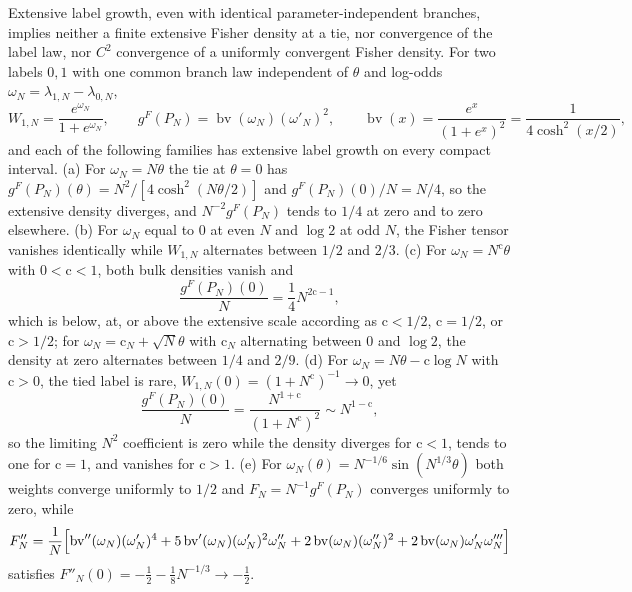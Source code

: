 \label{eq:rg-thermo-label-linear-tie-example}
\label{eq:rg-thermo-label-oscillatory-data}
\label{eq:rg-thermo-label-oscillatory-failure}
Extensive label growth, even with identical parameter-independent branches, implies neither a
finite extensive Fisher density at a tie, nor convergence of the label law, nor $C^2$ convergence
of a uniformly convergent Fisher density. For two labels $0,1$ with one common branch law
independent of $\theta$ and log-odds $\omega_N=\lambda_{1,N}-\lambda_{0,N}$,
\begin{equation}
W_{1,N}=\frac{e^{\omega_N}}{1+e^{\omega_N}},
\qquad
g^F(P_N)=\operatorname{bv}(\omega_N)(\omega'_N)^2,
\qquad
\operatorname{bv}(x)=\frac{e^x}{(1+e^x)^2}=\frac1{4\cosh^2(x/2)},
\label{eq:rg-thermo-label-binary-formula}
\end{equation}
and each of the following families has extensive label growth on every compact interval. (a) For
$\omega_N=N\theta$ the tie at $\theta=0$ has $g^F(P_N)(\theta)=N^2/[4\cosh^2(N\theta/2)]$ and
$g^F(P_N)(0)/N=N/4$, so the extensive density diverges, and $N^{-2}g^F(P_N)$ tends to $1/4$ at zero
and to zero elsewhere. (b) For $\omega_N$ equal to $0$ at even $N$ and $\log2$ at odd $N$, the
Fisher tensor vanishes identically while $W_{1,N}$ alternates between $1/2$ and $2/3$. (c) For
$\omega_N=N^{\mathrm c}\theta$ with $0<\mathrm c<1$, both bulk densities vanish and
\begin{equation}
\frac{g^F(P_N)(0)}N=\frac14N^{2\mathrm c-1},
\label{eq:rg-thermo-label-subextensive-example}
\end{equation}
which is below, at, or above the extensive scale according as $\mathrm c<1/2$, $\mathrm c=1/2$, or
$\mathrm c>1/2$; for $\omega_N=\mathrm c_N+\sqrt N\theta$ with $\mathrm c_N$ alternating between $0$
and $\log2$, the density at zero alternates between $1/4$ and $2/9$. (d) For
$\omega_N=N\theta-\mathrm c\log N$ with $\mathrm c>0$, the tied label is rare,
$W_{1,N}(0)=(1+N^{\mathrm c})^{-1}\to0$, yet
\begin{equation}
\frac{g^F(P_N)(0)}N=\frac{N^{1+\mathrm c}}{(1+N^{\mathrm c})^2}\sim N^{1-\mathrm c},
\label{eq:rg-thermo-label-rare-example}
\end{equation}
so the limiting $N^2$ coefficient is zero while the density diverges for $\mathrm c<1$, tends to one
for $\mathrm c=1$, and vanishes for $\mathrm c>1$. (e) For
$\omega_N(\theta)=N^{-1/6}\sin(N^{1/3}\theta)$ both weights converge uniformly to $1/2$ and
$F_N=N^{-1}g^F(P_N)$ converges uniformly to zero, while
\begin{equation}
F''_N=\frac1N\Bigl[\operatorname{bv}''(\omega_N)(\omega'_N)^4+5\operatorname{bv}'(\omega_N)(\omega'_N)^2\omega''_N
+2\operatorname{bv}(\omega_N)(\omega''_N)^2+2\operatorname{bv}(\omega_N)\omega'_N\omega'''_N\Bigr]
\label{eq:rg-thermo-label-oscillatory-derivative}
\end{equation}
satisfies $F''_N(0)=-\tfrac12-\tfrac18N^{-1/3}\to-\tfrac12$. 

